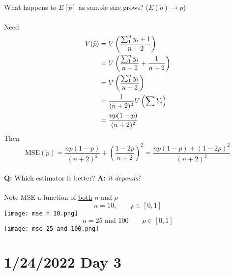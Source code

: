 \documentclass[12pt]{article}
\newcommand{\pars}[1]{\left( {#1} \right) }
\renewcommand{\over}[1]{\frac{1}{{#1}}}
\begin{document}
What happens to $E[\tilde{p}]$ as sample size grows? ($E\pars{\tilde{p}} \to p$)\\\\
Need
\begin{align}
    V(\tilde{p}) &= V\pars{\frac{\sum_1^n y_i + 1}{n+2}} \notag\\&=  V\pars{\frac{\sum_1^n y_i}{n+2} + \over{n+2}} \notag\\&= V\pars{\frac{\sum_1^n y_i}{n+2}} \notag\\ &= \over{(n+2)^2} V\pars{\sum Y_i} \notag\\ &= \frac{np(1-p)}{(n+2)^2}\notag
\end{align}
Then
$$\text{MSE}(\tilde{p}) = \frac{np(1-p)}{(n+2)^2} + \pars{\frac{1-2p}{n+2}}^2 = \frac{np(1-p) + (1-2p)^2}{(n+2)^2}$$
\\\textbf{Q:} Which estimator is better? \hspace{0.25in} \textbf{A:} \textit{it depends!}\\\\
Note MSE a function of \underline{both} $n$ and $p$
$$n = 10, \qquad p \in[0,1]$$
\texttt{[image: mse n 10.png]}
\\$$n = 25 \text{ and } 100 \qquad p \in [0,1]$$
\texttt{[image: mse 25 and 100.png]}
%
%
%
%
\newpage
\section*{1/24/2022 Day 3}
\end{document}
